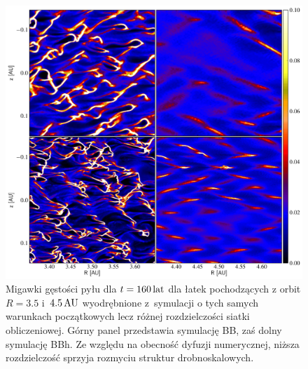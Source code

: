\begin{figure}
   \includegraphics[width=0.98\linewidth]{figures/fig10}
   \caption{Migawki gęstości pyłu dla $t = 160\hbox{$\thinspace\textrm{lat}$}$ dla łatek pochodzących z
      orbit $R=3.5$ i~$4.5\hbox{$\thinspace\textrm{AU}$}$ wyodrębnione z~symulacji o tych samych warunkach
      początkowych lecz różnej rozdzielczości siatki obliczeniowej. Górny panel
      przedstawia symulację BB, zaś dolny symulację BBh. Ze względu na obecność
      dyfuzji numerycznej, niższa rozdzielczość sprzyja rozmyciu struktur
      drobnoskalowych.}
   \label{fig10} 
\end{figure}

